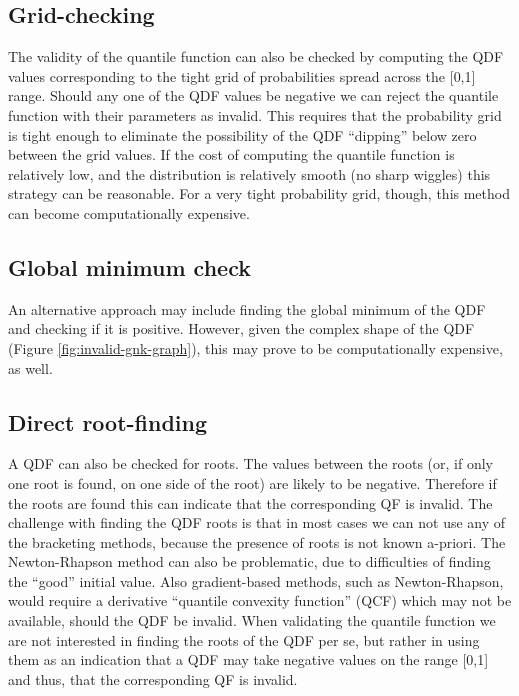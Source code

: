 \documentclass[
  12pt,
]{article}
\begin{document}
\hypertarget{grid-checking}{%
\subsection{Grid-checking}\label{grid-checking}}

The validity of the quantile function can also be checked by computing the QDF values corresponding to the tight grid of probabilities spread across the {[}0,1{]} range. Should any one of the QDF values be negative we can reject the quantile function with their parameters as invalid. This requires that the probability grid is tight enough to eliminate the possibility of the QDF ``dipping'' below zero between the grid values. If the cost of computing the quantile function is relatively low, and the distribution is relatively smooth (no sharp wiggles) this strategy can be reasonable. For a very tight probability grid, though, this method can become computationally expensive.

\hypertarget{global-minimum-check}{%
\subsection{Global minimum check}\label{global-minimum-check}}

An alternative approach may include finding the global minimum of the QDF and checking if it is positive. However, given the complex shape of the QDF (Figure \ref{fig:invalid-gnk-graph}), this may prove to be computationally expensive, as well.

\hypertarget{direct-root-finding}{%
\subsection{Direct root-finding}\label{direct-root-finding}}

A QDF can also be checked for roots. The values between the roots (or, if only one root is found, on one side of the root) are likely to be negative. Therefore if the roots are found this can indicate that the corresponding QF is invalid. The challenge with finding the QDF roots is that in most cases we can not use any of the bracketing methods, because the presence of roots is not known a-priori. The Newton-Rhapson method can also be problematic, due to difficulties of finding the ``good'' initial value. Also gradient-based methods, such as Newton-Rhapson, would require a derivative ``quantile convexity function'' (QCF) which may not be available, should the QDF be invalid. When validating the quantile function we are not interested in finding the roots of the QDF per se, but rather in using them as an indication that a QDF may take negative values on the range {[}0,1{]} and thus, that the corresponding QF is invalid.
\end{document}
